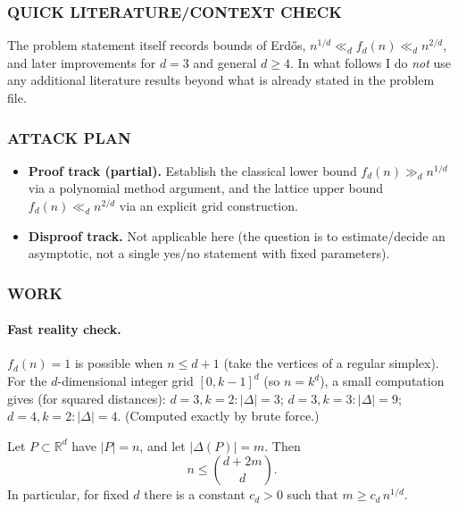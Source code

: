 \subsubsection*{QUICK LITERATURE/CONTEXT CHECK}
The problem statement itself records bounds of Erd\H{o}s,
\(n^{1/d}\ll_d f_d(n)\ll_d n^{2/d}\), and later improvements for \(d=3\) and general \(d\ge 4\).
In what follows I do \emph{not} use any additional literature results beyond what is already stated in the problem file.

\subsubsection*{ATTACK PLAN}
\begin{itemize}
\item \textbf{Proof track (partial).} Establish the classical lower bound \(f_d(n)\gg_d n^{1/d}\) via a polynomial method argument, and the lattice upper bound \(f_d(n)\ll_d n^{2/d}\) via an explicit grid construction.
\item \textbf{Disproof track.} Not applicable here (the question is to estimate/decide an asymptotic, not a single yes/no statement with fixed parameters).
\end{itemize}

\subsubsection*{WORK}

\paragraph{Fast reality check.}
\(f_d(n)=1\) is possible when \(n\le d+1\) (take the vertices of a regular simplex). For the \(d\)-dimensional integer grid \([0,k-1]^d\) (so \(n=k^d\)), a small computation gives (for squared distances):
\(d=3,k=2: |\Delta|=3\); \(d=3,k=3: |\Delta|=9\);
\(d=4,k=2: |\Delta|=4\). (Computed exactly by brute force.)

\begin{lemma}
Let \(P\subset\mathbb{R}^d\) have \(|P|=n\), and let \(|\Delta(P)|=m\). Then
\[
 n\le \binom{d+2m}{d}.
\]
In particular, for fixed \(d\) there is a constant \(c_d>0\) such that
\(m\ge c_d\, n^{1/d}\).
\end{lemma}

